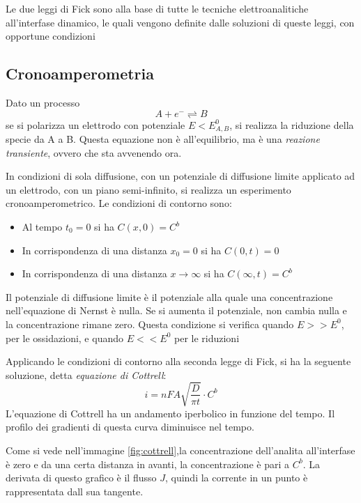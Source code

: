 Le due leggi di Fick sono alla base di tutte le tecniche elettroanalitiche all'interfase dinamico, le quali vengono definite dalle soluzioni di queste leggi, con opportune condizioni

\subsection{Cronoamperometria}
Dato un processo
\[
A + e^- \rightleftharpoons B
\]
se si polarizza un elettrodo con potenziale $E < E^0_{A,B}$, si realizza la riduzione della specie da A a B.
Questa equazione non è all'equilibrio, ma è una \emph{reazione transiente}, ovvero che sta avvenendo ora.

In condizioni di sola diffusione, con un potenziale di diffusione limite applicato ad un elettrodo, con un piano semi-infinito, si realizza un esperimento cronoamperometrico.
Le condizioni di contorno sono:
\begin{itemize}
\item Al tempo $t_0=0$ si ha $C(x,0)=C^b$
\item In corrispondenza di una distanza $x_0=0$ si ha $C(0,t)=0$
\item  In corrispondenza di una distanza $x \to \infty$ si ha $C(\infty,t)=C^b$
\end{itemize}


Il potenziale di diffusione limite è il potenziale alla quale una concentrazione nell'equazione di Nernst è nulla.
Se si aumenta il potenziale, non cambia nulla e la concentrazione rimane zero.
Questa condizione si verifica quando $E >> E^0$, per le ossidazioni, e quando $E << E^0$ per le riduzioni

Applicando le condizioni di contorno alla seconda legge di Fick, si ha la seguente soluzione, detta \emph{equazione di Cottrell}:
\[
i = n F A \sqrt{\frac{D}{\pi t}} \cdot C^b
\]
L'equazione di Cottrell ha un andamento iperbolico in funzione del tempo.
Il profilo dei gradienti di questa curva diminuisce nel tempo.


Come si vede nell'immagine \ref{fig:cottrell},la concentrazione dell'analita all'interfase è zero e da una certa distanza in avanti, la concentrazione è pari a $C^b$.
La derivata di questo grafico è il flusso $J$, quindi la corrente in un punto è rappresentata dall sua tangente.

